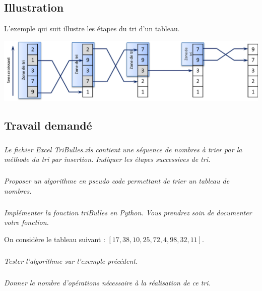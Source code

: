 \documentclass[11pt,oneside]{article}
\begin{document}
\subsection{Illustration}
L'exemple qui suit illustre les étapes du tri d'un tableau.
\begin{center}
\includegraphics[width=\textwidth]{png/bulles}
\end{center}


\subsection{Travail demandé}

\subparagraph{}
\textit{Le fichier Excel \textsl{TriBulles.xls} contient une séquence de nombres à trier par la méthode du tri par insertion. Indiquer les étapes successives de tri.}

\subparagraph{}
\textit{Proposer un algorithme en pseudo code permettant de trier un tableau de nombres. }


\subparagraph{}
\textit{Implémenter la fonction \textsf{triBulles} en Python. Vous prendrez soin de documenter votre fonction.}

On considère le tableau suivant : $[17,38,10,25,72,4,98,32,11]$.

\subparagraph{}
\textit{Tester l'algorithme sur l'exemple précédent.}

\subparagraph{}
\textit{Donner le nombre d'opérations nécessaire à la réalisation de ce tri.}
\end{document}
